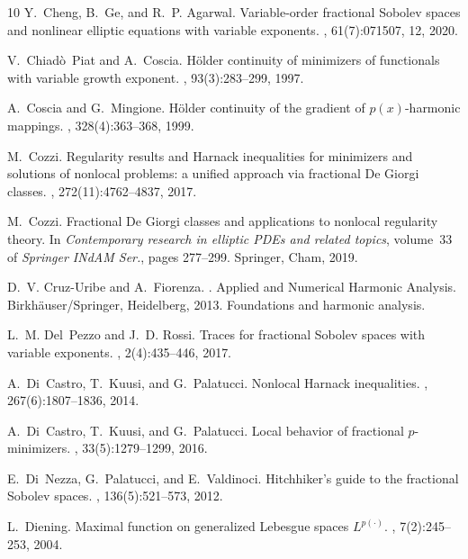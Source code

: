 \documentclass[11pt]{amsart}
\theoremstyle{plain}
\theoremstyle{definition}
\numberwithin{equation}{section}
\begin{document}
\begin{thebibliography}{10}
Y.~Cheng, B.~Ge, and R.~P. Agarwal.
\newblock Variable-order fractional {S}obolev spaces and nonlinear elliptic
  equations with variable exponents.
, 61(7):071507, 12, 2020.

V.~Chiad\`o~Piat and A.~Coscia.
\newblock H\"{o}lder continuity of minimizers of functionals with variable
  growth exponent.
, 93(3):283--299, 1997.

A.~Coscia and G.~Mingione.
\newblock H\"{o}lder continuity of the gradient of {$p(x)$}-harmonic mappings.
, 328(4):363--368, 1999.

M.~Cozzi.
\newblock Regularity results and {H}arnack inequalities for minimizers and
  solutions of nonlocal problems: a unified approach via fractional {D}e
  {G}iorgi classes.
, 272(11):4762--4837, 2017.

M.~Cozzi.
\newblock Fractional {D}e {G}iorgi classes and applications to nonlocal
  regularity theory.
\newblock In {\em Contemporary research in elliptic {PDE}s and related topics},
  volume~33 of {\em Springer INdAM Ser.}, pages 277--299. Springer, Cham, 2019.

D.~V. Cruz-Uribe and A.~Fiorenza.
.
\newblock Applied and Numerical Harmonic Analysis. Birkh\"{a}user/Springer,
  Heidelberg, 2013.
\newblock Foundations and harmonic analysis.

L.~M. Del~Pezzo and J.~D. Rossi.
\newblock Traces for fractional {S}obolev spaces with variable exponents.
, 2(4):435--446, 2017.

A.~Di~Castro, T.~Kuusi, and G.~Palatucci.
\newblock Nonlocal {H}arnack inequalities.
, 267(6):1807--1836, 2014.

A.~Di~Castro, T.~Kuusi, and G.~Palatucci.
\newblock Local behavior of fractional {$p$}-minimizers.
,
  33(5):1279--1299, 2016.

E.~Di~Nezza, G.~Palatucci, and E.~Valdinoci.
\newblock Hitchhiker's guide to the fractional {S}obolev spaces.
, 136(5):521--573, 2012.

L.~Diening.
\newblock Maximal function on generalized {L}ebesgue spaces {$L^{p(\cdot)}$}.
, 7(2):245--253, 2004.


\end{thebibliography}
\end{document}
